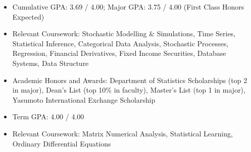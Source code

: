\documentclass[classic]{resume}
\begin{document}
    \address{Wu Yee Sun College, CUHK, Shatin, N.T., Hong Kong SAR}
    \maketitle
    \begin{itemize}
        \item Cumulative GPA: 3.69 / 4.00; Major GPA: 3.75 / 4.00 (First Class Honors Expected)
        \item Relevant Coursework: Stochastic Modelling \& Simulations, Time Series, Statistical Inference, Categorical Data Analysis, Stochastic Processes, Regression, Financial Derivatives, Fixed Income Securities, Database Systems, Data Structure
        \item Academic Honors and Awards: Department of Statistics Scholarships (top 2 in major), Dean's List (top 10\% in faculty), Master's List (top 1 in major), Yasumoto International Exchange Scholarship
    \end{itemize}
    \begin{itemize}
        \item Term GPA: 4.00 / 4.00
        \item Relevant Coursework: Matrix Numerical Analysis, Statistical Learning, Ordinary Differential Equations
    \end{itemize}
\end{document}
